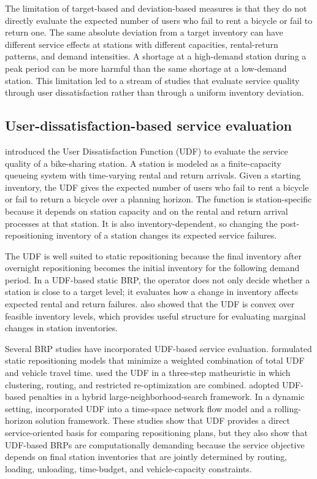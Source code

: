 The limitation of target-based and deviation-based measures is that they do not directly evaluate the expected number of users who fail to rent a bicycle or fail to return one. The same absolute deviation from a target inventory can have different service effects at stations with different capacities, rental-return patterns, and demand intensities. A shortage at a high-demand station during a peak period can be more harmful than the same shortage at a low-demand station. This limitation led to a stream of studies that evaluate service quality through user dissatisfaction rather than through a uniform inventory deviation.

\subsection{User-dissatisfaction-based service evaluation}

\citet{ravivOptimalInventoryManagement2013} introduced the User Dissatisfaction Function (UDF) to evaluate the service quality of a bike-sharing station. A station is modeled as a finite-capacity queueing system with time-varying rental and return arrivals. Given a starting inventory, the UDF gives the expected number of users who fail to rent a bicycle or fail to return a bicycle over a planning horizon. The function is station-specific because it depends on station capacity and on the rental and return arrival processes at that station. It is also inventory-dependent, so changing the post-repositioning inventory of a station changes its expected service failures.

The UDF is well suited to static repositioning because the final inventory after overnight repositioning becomes the initial inventory for the following demand period. In a UDF-based static BRP, the operator does not only decide whether a station is close to a target level; it evaluates how a change in inventory affects expected rental and return failures. \citet{ravivOptimalInventoryManagement2013} also showed that the UDF is convex over feasible inventory levels, which provides useful structure for evaluating marginal changes in station inventories.

Several BRP studies have incorporated UDF-based service evaluation. \citet{ravivStaticRepositioningBikesharing2013} formulated static repositioning models that minimize a weighted combination of total UDF and vehicle travel time. \citet{forma3stepMathHeuristic2015} used the UDF in a three-step matheuristic in which clustering, routing, and restricted re-optimization are combined. \citet{hoHybridLargeNeighborhood2017} adopted UDF-based penalties in a hybrid large-neighborhood-search framework. In a dynamic setting, \citet{zhangTimespaceNetworkFlow2017} incorporated UDF into a time-space network flow model and a rolling-horizon solution framework. These studies show that UDF provides a direct service-oriented basis for comparing repositioning plans, but they also show that UDF-based BRPs are computationally demanding because the service objective depends on final station inventories that are jointly determined by routing, loading, unloading, time-budget, and vehicle-capacity constraints.

